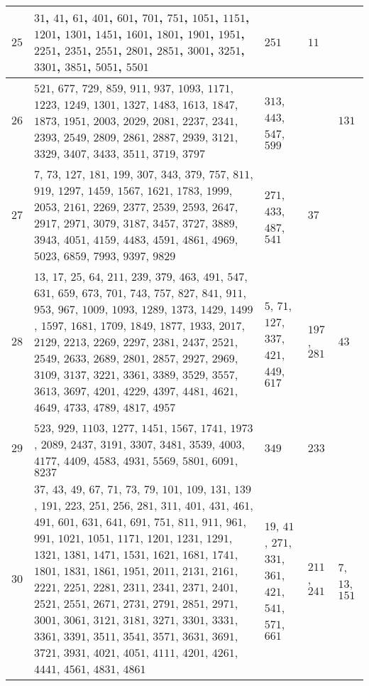 \documentclass[11pt,reqno]{amsart}
\begin{document}
\begin{longtable}{ | p{0.5cm} | p{9cm} | p{2.5cm} | p{2.1cm} | p{2.1cm} | }
\hline
$25$ & $31$, $41$, $61$, $401$, $601$, $701$, $751$, $1051$, $1151$, $1201$, $1301$, $1451$, $1601$, $1801$, $1901$, $1951$, $2251$, $2351$, $2551$, $2801$, $2851$, $3001$, $3251$, $3301$, $3851$, $5051$, $5501$ & $251$ & $11$ & \ \ \\
\hline
$26$ & $521$, $677$, $729$, $859$, $911$, $937$, $1093$, $1171$, $1223$, $1249$, $1301$, $1327$, $1483$, $1613$, $1847$, $1873$, $1951$, $2003$, $2029$, $2081$, $2237$, $2341$, $2393$, $2549$, $2809$, $2861$, $2887$, $2939$, $3121$, $3329$, $3407$, $3433$, $3511$, $3719$, $3797$ & $313$, $443$, $547$, $599$ & \ \ & $131$ \\
\hline
$27$ & $7$, $73$, $127$, $181$, $199$, $307$, $343$, $379$, $757$, $811$, $919$, $1297$, $1459$, $1567$, $1621$, $1783$, $1999$, $2053$, $2161$, $2269$, $2377$, $2539$, $2593$, $2647$, $2917$, $2971$, $3079$, $3187$, $3457$, $3727$, $3889$, $3943$, $4051$, $4159$, $4483$, $4591$, $4861$, $4969$, $5023$, $6859$, $7993$, $9397$, $9829$ & $271$, $433$, $487$, $541$ & $37$ & \ \ \\
\hline
$28$ & $13$, $17$, $25$, $64$, $211$, $239$, $379$, $463$, $491$, $547$, $631$, $659$, $673$, $701$, $743$, $757$, $827$, $841$, $911$, $953$, $967$, $1009$, $1093$, $1289$, $1373$, $1429$, $1499$, $1597$, $1681$, $1709$, $1849$, $1877$, $1933$, $2017$, $2129$, $2213$, $2269$, $2297$, $2381$, $2437$, $2521$, $2549$, $2633$, $2689$, $2801$, $2857$, $2927$, $2969$, $3109$, $3137$, $3221$, $3361$, $3389$, $3529$, $3557$, $3613$, $3697$, $4201$, $4229$, $4397$, $4481$, $4621$, $4649$, $4733$, $4789$, $4817$, $4957$ & $5$, $71$, $127$, $337$, $421$, $449$, $617$ & $197$, $281$ & $43$ \\
\hline
$29$ & $523$, $929$, $1103$, $1277$, $1451$, $1567$, $1741$, $1973$, $2089$, $2437$, $3191$, $3307$, $3481$, $3539$, $4003$, $4177$, $4409$, $4583$, $4931$, $5569$, $5801$, $6091$, $8237$ & $349$ & $233$ & \ \ \\
\hline
$30$ & $37$, $43$, $49$, $67$, $71$, $73$, $79$, $101$, $109$, $131$, $139$, $191$, $223$, $251$, $256$, $281$, $311$, $401$, $431$, $461$, $491$, $601$, $631$, $641$, $691$, $751$, $811$, $911$, $961$, $991$, $1021$, $1051$, $1171$, $1201$, $1231$, $1291$, $1321$, $1381$, $1471$, $1531$, $1621$, $1681$, $1741$, $1801$, $1831$, $1861$, $1951$, $2011$, $2131$, $2161$, $2221$, $2251$, $2281$, $2311$, $2341$, $2371$, $2401$, $2521$, $2551$, $2671$, $2731$, $2791$, $2851$, $2971$, $3001$, $3061$, $3121$, $3181$, $3271$, $3301$, $3331$, $3361$, $3391$, $3511$, $3541$, $3571$, $3631$, $3691$, $3721$, $3931$, $4021$, $4051$, $4111$, $4201$, $4261$, $4441$, $4561$, $4831$, $4861$ & $19$, $41$, $271$, $331$, $361$, $421$, $541$, $571$, $661$ & $211$, $241$ & $7$, $13$, $151$ \\

\end{longtable}
\end{document}
